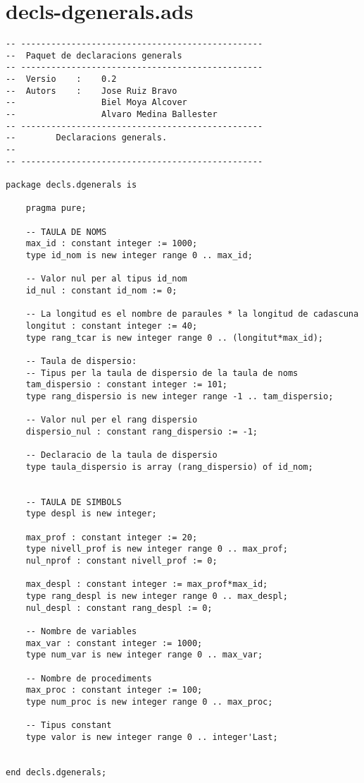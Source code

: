 \documentclass[10pt]{report}
\begin{document}
    \section{decls-dgenerals.ads}
    \begin{lstlisting}[style=Ada]
-- ------------------------------------------------
--  Paquet de declaracions generals
-- ------------------------------------------------
--  Versio    :    0.2
--  Autors    :    Jose Ruiz Bravo
--                 Biel Moya Alcover
--                 Alvaro Medina Ballester
-- ------------------------------------------------
--        Declaracions generals.
--
-- ------------------------------------------------

package decls.dgenerals is

    pragma pure;

    -- TAULA DE NOMS
    max_id : constant integer := 1000;
    type id_nom is new integer range 0 .. max_id;
    
    -- Valor nul per al tipus id_nom
    id_nul : constant id_nom := 0;
        
    -- La longitud es el nombre de paraules * la longitud de cadascuna
    longitut : constant integer := 40;
    type rang_tcar is new integer range 0 .. (longitut*max_id);
    
    -- Taula de dispersio:
    -- Tipus per la taula de dispersio de la taula de noms
    tam_dispersio : constant integer := 101;
    type rang_dispersio is new integer range -1 .. tam_dispersio;
    
    -- Valor nul per el rang dispersio
    dispersio_nul : constant rang_dispersio := -1;
    
    -- Declaracio de la taula de dispersio
    type taula_dispersio is array (rang_dispersio) of id_nom;
    
    
    -- TAULA DE SIMBOLS
    type despl is new integer;
    
    max_prof : constant integer := 20;
    type nivell_prof is new integer range 0 .. max_prof;
    nul_nprof : constant nivell_prof := 0;
    
    max_despl : constant integer := max_prof*max_id;
    type rang_despl is new integer range 0 .. max_despl;
    nul_despl : constant rang_despl := 0;
    
    -- Nombre de variables
    max_var : constant integer := 1000;
    type num_var is new integer range 0 .. max_var;
    
    -- Nombre de procediments
    max_proc : constant integer := 100;
    type num_proc is new integer range 0 .. max_proc;
    
    -- Tipus constant
    type valor is new integer range 0 .. integer'Last;


end decls.dgenerals;
    \end{lstlisting}
    \newpage
        
\end{document}
